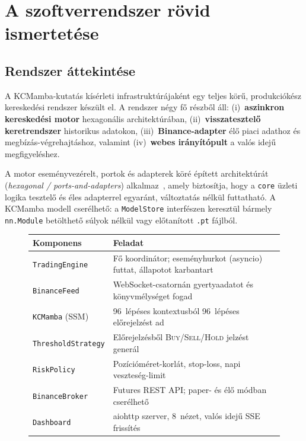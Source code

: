 \chapter{A szoftverrendszer rövid ismertetése}
\label{ch:user_docs}

\section{Rendszer áttekintése}

A KCMamba-kutatás kísérleti infrastruktúrájaként egy teljes körű,
produkciókész kereskedési rendszer készült el. A rendszer négy fő részből
áll: (i)~\textbf{aszinkron kereskedési motor} hexagonális architektúrában,
(ii)~\textbf{visszatesztelő keretrendszer} historikus adatokon,
(iii)~\textbf{Binance-adapter} élő piaci adathoz és megbízás-végrehajtáshoz,
valamint (iv)~\textbf{webes irányítópult} a valós idejű megfigyeléshez.

A motor eseményvezérelt, portok és adapterek köré épített architektúrát
(\emph{hexagonal / ports-and-adapters}) alkalmaz~\cite{cockburn2005hexagonal},
amely biztosítja, hogy a \texttt{core} üzleti logika tesztelő és éles
adapterrel egyaránt, változtatás nélkül futtatható. A KCMamba modell
cserélhető: a \texttt{ModelStore} interfészen keresztül bármely
\texttt{nn.Module} betölthető súlyok nélkül vagy előtanított
\texttt{.pt} fájlból.

\begin{figure}[H]
  \centering
  \small
  \begin{tabular}{|p{3.8cm}|p{10.5cm}|}
    \hline
    \textbf{Komponens} & \textbf{Feladat} \\
    \hline\hline
    \texttt{TradingEngine}    & Fő koordinátor; eseményhurkot (asyncio) futtat, állapotot karbantart \\
    \texttt{BinanceFeed}      & WebSocket-csatornán gyertyaadatot és könyvmélységet fogad \\
    \texttt{KCMamba} (SSM)    & 96~lépéses kontextusból 96~lépéses előrejelzést ad \\
    \texttt{ThresholdStrategy}& Előrejelzésből \textsc{Buy/Sell/Hold} jelzést generál \\
    \texttt{RiskPolicy}       & Pozícióméret-korlát, stop-loss, napi veszteség-limit \\
    \texttt{BinanceBroker}    & Futures REST API; paper- és élő módban cserélhető \\
    \texttt{Dashboard}        & aiohttp szerver, 8~nézet, valós idejű SSE frissítés \\
    \hline
  \end{tabular}
  \label{tab:components}
\end{figure}

